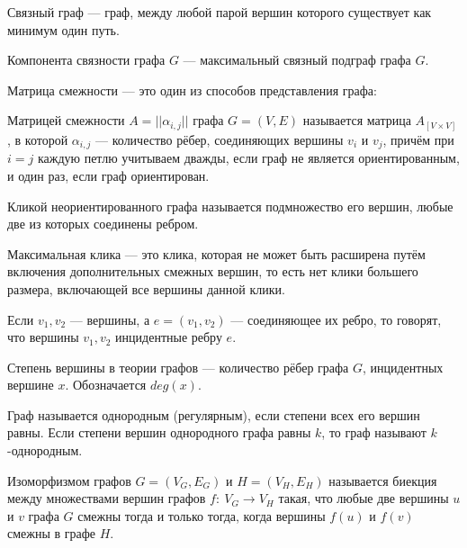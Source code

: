 \begin{my_def}
Связный граф --- граф, между любой парой вершин которого существует как
минимум один путь.
\end{my_def}

\begin{my_def}
Компонента связности графа  $G$ --- максимальный связный подграф графа  $G$.
\end{my_def}

Матрица смежности --- это один из способов представления графа:

\begin{my_def}
Матрицей смежности $A=||\alpha_{i,j}||$ графа $G=(V,E)$ называется матрица $A_{[V\times{}V]}$, в которой $\alpha_{i,j}$ --- количество рёбер,
соединяющих вершины $v_i$ и $v_j$, причём при $i=j$ каждую петлю учитываем дважды,
если граф не является ориентированным, и один раз, если граф ориентирован.
\end{my_def}

\begin{my_def}
Кликой неориентированного графа называется подмножество его вершин, любые две из
которых соединены ребром.

Максимальная клика --- это клика, которая не может быть
расширена путём включения дополнительных смежных вершин, то есть нет клики большего
размера, включающей все вершины данной клики.
\end{my_def}

\begin{my_def}
Если $v_{1}, v_{2}$ --- вершины, а  $e=(v_{1},v_{2})$ --- соединяющее их ребро, то
говорят, что вершины $v_{1}, v_{2}$ инцидентные ребру $e$.
\end{my_def}

\begin{my_def}
Степень вершины в теории графов --- количество рёбер графа $G$, инцидентных вершине $x$.
Обозначается $deg(x)$.
\end{my_def}

\begin{my_def}
Граф называется однородным (регулярным), если степени всех его вершин равны.
Если степени вершин однородного графа равны $k$, то граф называют $k$-однородным.
\end{my_def}

\begin{my_def}
Изоморфизмом графов  $G=\left(V_{G},E_{G}\right)$  и
$H=\left(V_{H},E_{H}\right)$  называется биекция между множествами
вершин графов  $f\colon \ V_{G}\rightarrow V_{H}$ такая, что любые две вершины
$u$ и  $v$ графа  $G$ смежны тогда и только тогда, когда вершины  $f(u)$ и $f(v)$
смежны в графе  $H$.
\end{my_def}

